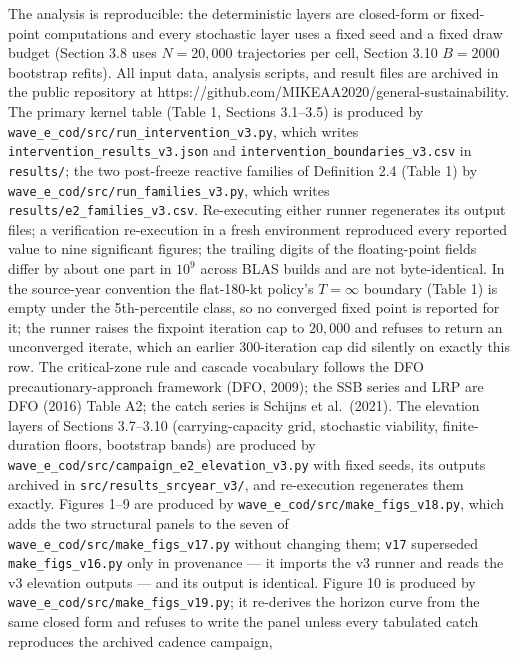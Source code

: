 The analysis is reproducible: the deterministic layers are closed-form or
fixed-point computations and every stochastic layer uses a fixed seed and a
fixed draw budget (Section 3.8 uses \(N = 20{,}000\) trajectories per cell,
Section 3.10 \(B = 2000\) bootstrap refits). All input data, analysis
scripts, and result files are archived in the public repository at
https://github.com/MIKEAA2020/general-sustainability. The primary kernel
table (Table 1, Sections 3.1--3.5) is produced by
\texttt{wave\_e\_cod/src/run\_intervention\_v3.py}, which writes
\texttt{intervention\_results\_v3.json} and
\texttt{intervention\_boundaries\_v3.csv} in \texttt{results/}; the two post-freeze
reactive families of Definition 2.4 (Table 1) by
\texttt{wave\_e\_cod/src/\allowbreak{}run\_families\_v3.py}, which
writes
\texttt{results/e2\_families\_v3.csv}. Re-executing either runner
regenerates its output files; a
verification re-execution in a fresh environment reproduced every
reported value to nine significant figures; the trailing digits of the
floating-point fields differ by about one part in \(10^{9}\) across BLAS
builds and are not byte-identical. In the source-year convention the flat-180-kt policy's
\(T=\infty\) boundary (Table 1) is empty under the 5th-percentile class,
so no converged fixed point is reported for it; the runner raises the
fixpoint iteration cap to \(20{,}000\) and refuses to return an
unconverged iterate, which an earlier \(300\)-iteration cap did silently
on exactly this row. The critical-zone
rule and cascade vocabulary follows the DFO precautionary-approach
framework (DFO, 2009); the SSB series and LRP are DFO (2016) Table A2;
the catch series is Schijns et al.~(2021). The elevation layers of
Sections 3.7--3.10 (carrying-capacity grid, stochastic viability,
finite-duration floors, bootstrap bands) are produced by
\texttt{wave\_e\_cod/src/campaign\_e2\_elevation\_v3.py} with fixed
seeds, its outputs archived in \texttt{src/results\_srcyear\_v3/}, and
re-execution regenerates them exactly. Figures 1--9 are produced by
\texttt{wave\_e\_cod/src/make\_figs\_v18.py}, which adds the two
structural panels to the seven of
\texttt{wave\_e\_cod/src/make\_figs\_v17.py} without changing them;
\texttt{v17} superseded \texttt{make\_figs\_v16.py} only in
provenance --- it imports the v3 runner and reads the v3 elevation
outputs --- and its output is
identical. Figure 10 is produced by
\texttt{wave\_e\_cod/src/make\_figs\_v19.py}; it re-derives the
horizon curve from the same closed form and refuses to write the panel
unless every tabulated catch reproduces the archived cadence campaign,
